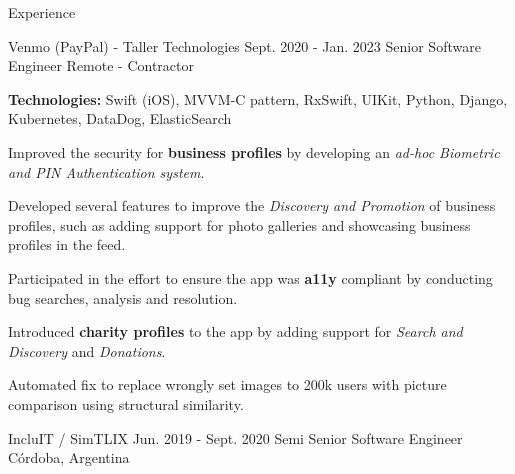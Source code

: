 \documentclass{curriculum}
\begin{document}
\begin{cvsection}{Experience}

    \makesectionitemheader
        {Venmo (PayPal) - Taller Technologies}      {Sept. 2020 - Jan. 2023}
        {Senior Software Engineer}                  {Remote - Contractor}

        \begin{sectionitemlist}
        \item{
            \textbf{Technologies:} Swift (iOS), MVVM-C pattern, RxSwift, UIKit,
            Python, Django, Kubernetes, DataDog, ElasticSearch
        }
        \item{
            Improved the security for \textbf{business profiles}
            by developing an \textit{ad-hoc Biometric and PIN Authentication system}.
        }
        \item{
            Developed several features to improve the \textit{Discovery and Promotion}
            of business profiles, such as adding support for photo galleries
            and showcasing business profiles in the feed.
        }
        \item{
            Participated in the effort to ensure the app was \textbf{a11y} compliant
            by conducting bug searches, analysis and resolution.
        }
        \item{
            Introduced \textbf{charity profiles} to the app by adding support
            for \textit{Search and Discovery} and \textit{Donations}.
        }
        \item{
            Automated fix to replace wrongly set images to 200k users with
            picture comparison using structural similarity.
        }
        \end{sectionitemlist}


    \makesectionitemheader
        {IncluIT / SimTLIX}                    {Jun. 2019 - Sept. 2020}
        {Semi Senior Software Engineer}        {Córdoba, Argentina}


\end{cvsection}
\end{document}
